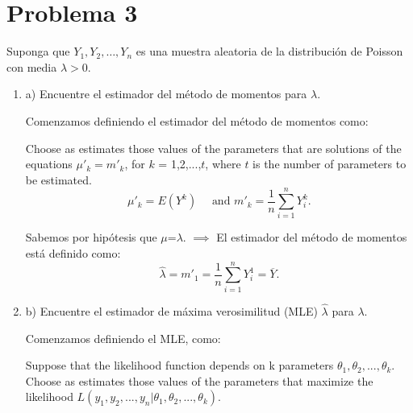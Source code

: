 \section{Problema 3}

Suponga que $Y_{1}, Y_{2}, \ldots, Y_{n}$ es una muestra aleatoria de la distribución de Poisson con media $\lambda>0$.

\begin{enumerate}
	\item a) Encuentre el estimador del método de momentos para $\lambda$.
	\begin{solution}
		Comenzamos definiendo el estimador del método de momentos como:
		\begin{tcolorbox}[colback=gray!15,colframe=black!1!black,title=Method of moments]
			Choose as estimates those values of the parameters that are solutions of the equations $\mu'_k = m'_k$, for $k$ = 1,2,...,$t$, where $t$ is the number of parameters to be estimated. 
			$$\mu'_k=E(Y^k)\quad \text{ and } m'_k=\frac{1}{n}\sum_{i=1}^nY_i^k. $$
			\end{tcolorbox}
			Sabemos por hipótesis que $\mu$=$\lambda$. $\implies$ El estimador del método de momentos  está definido como: $$\hat{\lambda}=m'_1=\frac{1}{n}\sum_{i=1}^nY_i^1=\overline{Y}.$$
		
			\end{solution}
	
	\item b) Encuentre el estimador de máxima verosimilitud (MLE) $\hat{\lambda}$ para $\lambda$. 
	\begin{solution}
		Comenzamos definiendo el MLE, como: 
		\begin{tcolorbox}[colback=gray!15,colframe=black!1!black,title=Method of Maximum Likehood]
			Suppose that the likelihood function depends on k parameters $\theta_1,\theta_2,...,\theta_k$. Choose as estimates those values of the parameters that maximize the likelihood $L(y_1, y_2,..., y_n |\theta_1,\theta_2,...,\theta_k)$.
		\end{tcolorbox}
		

\end{solution}
\end{enumerate}
